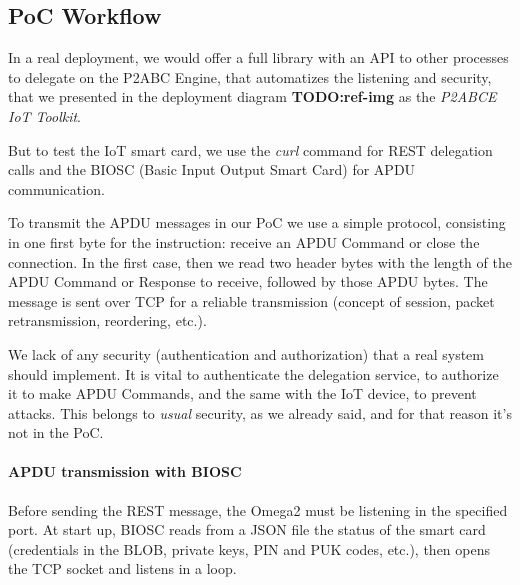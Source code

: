 


\subsection{PoC Workflow}




In a real deployment, we would offer a full library with an API to other processes to delegate on the P2ABC Engine, that automatizes the listening and security, that we presented in the deployment diagram \textbf{TODO:ref-img} as the \textit{P2ABCE IoT Toolkit}.

But to test the IoT smart card, we use the \textit{curl} command for REST delegation calls and the BIOSC (Basic Input Output Smart Card) for APDU communication.

To transmit the APDU messages in our PoC we use a simple protocol, consisting in one first byte for the instruction: receive an APDU Command or close the connection. In the first case, then we read two header bytes with the length of the APDU Command or Response to receive, followed by those APDU bytes. The message is sent over TCP for a reliable transmission (concept of session, packet retransmission, reordering, etc.).

We lack of any security (authentication and authorization) that a real system should implement. It is vital to authenticate the delegation service, to authorize it to make APDU Commands, and the same with the IoT device, to prevent attacks. This belongs to \textit{usual} security, as we already said, and for that reason it's not in the PoC.

\paragraph{APDU transmission with BIOSC}



Before sending the REST message, the Omega2 must be listening in the specified port. At start up, BIOSC reads from a JSON file the status of the smart card (credentials in the BLOB, private keys, PIN and PUK codes, etc.), then opens the TCP socket and listens in a loop.

